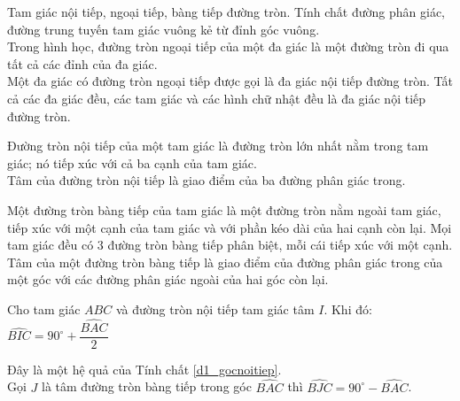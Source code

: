 \begin{dn}
Tam giác nội tiếp, ngoại tiếp, bàng tiếp đường tròn. Tính chất đường phân giác, đường trung tuyến tam giác vuông kẻ từ đỉnh góc vuông.\\
Trong hình học, đường tròn ngoại tiếp của một đa giác là một đường tròn đi qua tất cả các đỉnh của đa giác.\\
Một đa giác có đường tròn ngoại tiếp được gọi là đa giác nội tiếp đường tròn. Tất cả các đa giác đều, các tam giác và các hình chữ nhật đều là đa giác nội tiếp đường tròn.
\end{dn}

\begin{dn}
Đường tròn nội tiếp của một tam giác là đường tròn lớn nhất nằm trong tam giác; nó tiếp xúc với cả ba cạnh của tam giác.\\
Tâm của đường tròn nội tiếp là giao điểm của ba đường phân giác trong.
\end{dn}

\begin{dn}
Một đường tròn bàng tiếp của tam giác là một đường tròn nằm ngoài tam giác, tiếp xúc với một cạnh của tam giác và với phần kéo dài của hai cạnh còn lại.
Mọi tam giác đều có 3 đường tròn bàng tiếp phân biệt, mỗi cái tiếp xúc với một cạnh.\\
Tâm của một đường tròn bàng tiếp là giao điểm của đường phân giác trong của một góc với các đường phân giác ngoài của hai góc còn lại.
\end{dn}

\begin{tc}\label{d1_gocnoitiep}
Cho tam giác $ABC$ và đường tròn nội tiếp tam giác tâm $I$. Khi đó: $\widehat{BIC}=90^\circ+\dfrac{\widehat{BAC}}{2}$
\end{tc}

\begin{hq}
Đây là một hệ quả của Tính chất \ref{d1_gocnoitiep}.\\
Gọi $J$ là tâm đường tròn bàng tiếp trong góc $\widehat{BAC}$ thì $\widehat{BJC}=90^\circ-\widehat{BAC}$.
\end{hq}

